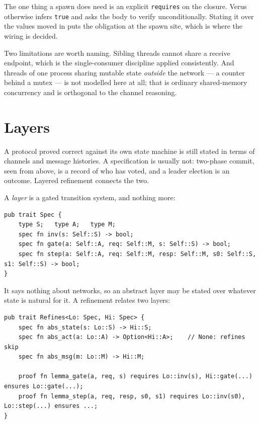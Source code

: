 \documentclass[11pt]{article}
\newcommand{\code}[1]{\texttt{#1}}
\newcommand{\srcname}[1]{%
  \vspace{0.9em}\noindent{\sffamily\scriptsize\color{comment}\MakeUppercase{#1}}\par
  \vspace{-0.7em}}
\begin{document}
The one thing a spawn does need is an explicit \code{requires} on the closure.
Verus otherwise infers \code{true} and asks the body to verify unconditionally.
Stating it over the values moved in puts the obligation at the spawn site, which
is where the wiring is decided.

Two limitations are worth naming. Sibling threads cannot share a receive
endpoint, which is the single-consumer discipline applied consistently. And
threads of one process sharing mutable state \emph{outside} the network --- a
counter behind a mutex --- is not modelled here at all; that is ordinary
shared-memory concurrency and is orthogonal to the channel reasoning.

\section{Layers}\label{sec:layers}

A protocol proved correct against its own state machine is still stated in terms
of channels and message histories. A specification is usually not: two-phase
commit, seen from above, is a record of who has voted, and a leader election is
an outcome. Layered refinement connects the two.

A \emph{layer} is a gated transition system, and nothing more:

\srcname{src/layer.rs}
\begin{lstlisting}
pub trait Spec {
    type S;   type A;   type M;
    spec fn inv(s: Self::S) -> bool;
    spec fn gate(a: Self::A, req: Self::M, s: Self::S) -> bool;
    spec fn step(a: Self::A, req: Self::M, resp: Self::M, s0: Self::S, s1: Self::S) -> bool;
}
\end{lstlisting}

It says nothing about networks, so an abstract layer may be stated over whatever
state is natural for it. A refinement relates two layers:

\srcname{src/layer.rs}
\begin{lstlisting}
pub trait Refines<Lo: Spec, Hi: Spec> {
    spec fn abs_state(s: Lo::S) -> Hi::S;
    spec fn abs_act(a: Lo::A) -> Option<Hi::A>;    // None: refines skip
    spec fn abs_msg(m: Lo::M) -> Hi::M;

    proof fn lemma_gate(a, req, s) requires Lo::inv(s), Hi::gate(...) ensures Lo::gate(...);
    proof fn lemma_step(a, req, resp, s0, s1) requires Lo::inv(s0), Lo::step(...) ensures ...;
}
\end{lstlisting}
\end{document}
